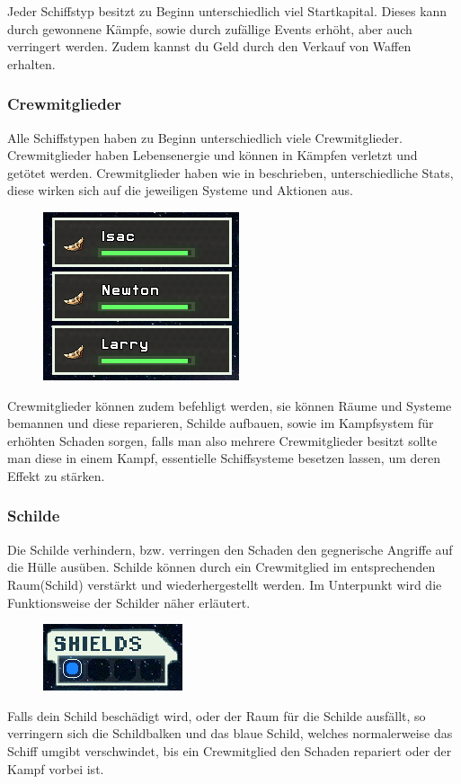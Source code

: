 \documentclass[fontsize=12pt,paper=a4,twoside]{scrartcl}
\begin{document}
Jeder Schiffstyp besitzt zu Beginn unterschiedlich viel Startkapital. Dieses kann durch gewonnene Kämpfe, sowie durch zufällige Events erhöht, aber auch verringert werden. Zudem kannst du Geld durch den Verkauf von Waffen erhalten.

\subsubsection{Crewmitglieder}
Alle Schiffstypen haben zu Beginn unterschiedlich viele Crewmitglieder. Crewmitglieder haben Lebensenergie und können in Kämpfen verletzt und getötet werden. Crewmitglieder haben wie in  beschrieben, unterschiedliche Stats, diese wirken sich auf die jeweiligen Systeme und Aktionen aus.
\begin{figure}[H]
\centering
\includegraphics[width=0.4\linewidth]{DasSpiel/Ui/Crew.png}
\end{figure}
Crewmitglieder können zudem befehligt werden, sie können Räume und Systeme bemannen und diese reparieren, Schilde aufbauen, sowie im Kampfsystem für erhöhten Schaden sorgen, falls man also mehrere Crewmitglieder besitzt sollte man diese in einem Kampf, essentielle Schiffsysteme besetzen lassen, um deren Effekt zu stärken.


\subsubsection{Schilde}
Die Schilde verhindern, bzw. verringen den Schaden den gegnerische Angriffe auf die Hülle ausüben. Schilde können durch ein Crewmitglied im entsprechenden Raum(Schild) verstärkt und wiederhergestellt werden. Im Unterpunkt  wird die Funktionsweise der Schilder näher erläutert.
\begin{figure}[H]
\centering
\includegraphics[width=0.4\linewidth]{DasSpiel/Ui/shield.png}
\end{figure}
Falls dein Schild beschädigt wird, oder der Raum für die Schilde ausfällt, so verringern sich die Schildbalken und das blaue Schild, welches normalerweise das Schiff umgibt verschwindet, bis ein Crewmitglied den Schaden repariert oder der Kampf vorbei ist.
\end{document}

